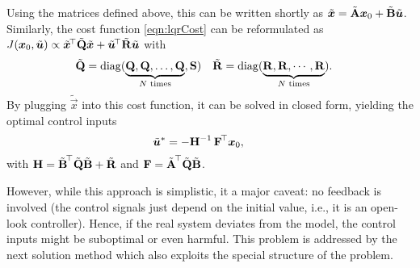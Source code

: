 			Using the matrices defined above, this can be written shortly as \( \tilde{\bm{x}} = \tilde{\bm{\mathrm{A}}} \bm{x}_0 + \tilde{\bm{\mathrm{B}}} \tilde{\bm{u}} \). Similarly, the cost function \eqref{eqn:lqrCost} can be reformulated as \( J(\bm{x}_0, \tilde{\bm{u}}) \propto \tilde{\bm{x}}^{\!\top} \tilde{\bm{\mathrm{Q}}} \tilde{\bm{x}} + \tilde{\bm{u}}^{\!\top} \tilde{\bm{\mathrm{R}}} \tilde{\bm{u}} \) with
			\begin{align}
				\tilde{\bm{\mathrm{Q}}} & = \operatorname{diag}(\underbrace{\bm{\mathrm{Q}}, \bm{\mathrm{Q}}, \dots, \bm{\mathrm{Q}}}_{N\text{ times}}, \bm{\mathrm{S}}) &
				\tilde{\bm{\mathrm{R}}} & = \operatorname{diag}(\underbrace{\bm{\mathrm{R}}, \bm{\mathrm{R}}, \cdots, \bm{\mathrm{R}}}_{N\text{ times}}).
			\end{align}
			By plugging \(\tilde{\vec{x}}\) into this cost function, it can be solved in closed form, yielding the optimal control inputs
			\begin{equation}
				\tilde{\bm{u}}^\ast = -\bm{\mathrm{H}}^{-1}\, \bm{\mathrm{F}}^{\!\top} \bm{x}_0,\qquad
			\end{equation}
			with \( \bm{\mathrm{H}} = \tilde{\bm{\mathrm{B}}}^{\!\top} \tilde{\bm{\mathrm{Q}}} \tilde{\bm{\mathrm{B}}} + \tilde{\bm{\mathrm{R}}} \) and \( \bm{\mathrm{F}} = \tilde{\bm{\mathrm{A}}}^{\!\top} \tilde{\bm{\mathrm{Q}}} \tilde{\bm{\mathrm{B}}} \).

			However, while this approach is simplistic, it a major caveat: no feedback is involved (the control signals just depend on the initial value, i.e., it is an open-look controller). Hence, if the real system deviates from the model, the control inputs might be suboptimal or even harmful. This problem is addressed by the next solution method which also exploits the special structure of the problem.

